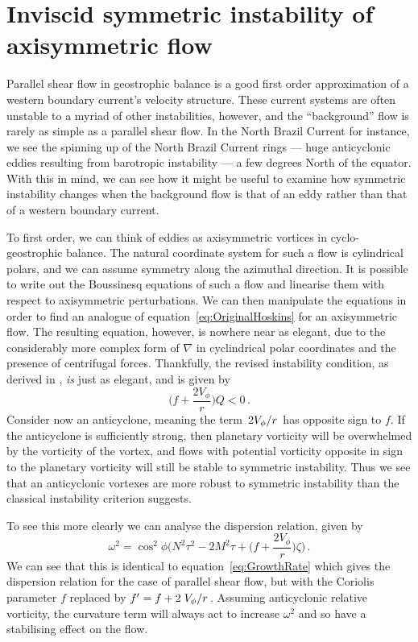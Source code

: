 \section{Inviscid symmetric instability of axisymmetric flow}
Parallel shear flow in geostrophic balance is a good first order approximation of a western boundary current's velocity structure. These current systems are often unstable to a myriad of other instabilities, however, and the ``background'' flow is rarely as simple as a parallel shear flow. In the North Brazil Current for instance, we see the spinning up of the North Brazil Current rings --- huge anticyclonic eddies resulting from barotropic instability --- a few degrees North of the equator. With this in mind, we can see how it might be useful to examine how symmetric instability changes when the background flow is that of an eddy rather than that of a western boundary current.

To first order, we can think of eddies as axisymmetric vortices in cyclo-geostrophic balance. The natural coordinate system for such a flow is cylindrical polars, and we can assume symmetry along the azimuthal direction. It is possible to write out the Boussinesq equations of such a flow and linearise them with respect to axisymmetric perturbations. We can then manipulate the equations in order to find an analogue of equation~\ref{eq:OriginalHoskins} for an axisymmetric flow. The resulting equation, however, is nowhere near as elegant, due to the considerably more complex form of $\nabla$ in cyclindrical polar coordinates and the presence of centrifugal forces\footnotemark. Thankfully, the revised instability condition, as derived in \citet{Buckingham2021}, \textit{is} just as elegant, and is given by
\begin{equation}
    \bigg(f + \frac{2 V_\phi}{r}\bigg)Q < 0 \, .
\end{equation}
Consider now an anticyclone, meaning the term $\flatfrac{2V_\phi}{r}$ has opposite sign to $f$. If the anticyclone is sufficiently strong, then planetary vorticity will be overwhelmed by the vorticity of the vortex, and flows with potential vorticity  opposite in sign to the planetary vorticity will still be stable to symmetric instability. Thus we see that an anticyclonic vortexes are more robust to symmetric instability than the classical instability criterion suggests.

To see this more clearly we can analyse the dispersion relation, given by
\begin{equation}
    \label{eq:GrowthRateCurv}
    \omega^2 = \cos^2\phi \Bigg(N^2 \tau^2 - 2M^2\tau + \bigg(f + \frac{2V_\phi}{r}\bigg)\zeta\Bigg) \, .
\end{equation}
We can see that this is identical to equation~\ref{eq:GrowthRate} which gives the dispersion relation for the case of parallel shear flow, but with the Coriolis parameter $f$ replaced by $f' = f + 2 \flatfrac{V_\phi}{r}$. Assuming anticyclonic relative vorticity, the curvature term will always act to increase $\omega^2$ and so have a stabilising effect on the flow.

